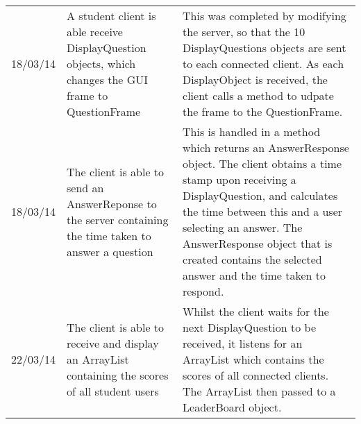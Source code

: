 \begin{longtabu}{l X X}
18/03/14	&A student client is able receive DisplayQuestion objects, which changes the GUI frame to QuestionFrame	&This was completed by modifying the server, so that the 10 DisplayQuestions objects are sent to each connected client. As each DisplayObject is received, the client calls a method to udpate the frame to the QuestionFrame.\\
18/03/14	&The client is able to send an AnswerReponse to the server  containing the time taken to answer a question	&This is handled in a method which returns an AnswerResponse object. The client obtains a time stamp upon receiving a DisplayQuestion, and calculates the time between this and a user selecting an answer. The AnswerResponse object that is created contains the selected answer and the time taken to respond.\\
22/03/14	&The client is able to receive and display an ArrayList containing the scores of all student users	&Whilst the client waits for the next DisplayQuestion to be received, it listens for an ArrayList which contains the scores of all connected clients. The ArrayList then passed to a LeaderBoard object.\\
\bottomrule
\end{longtabu}
